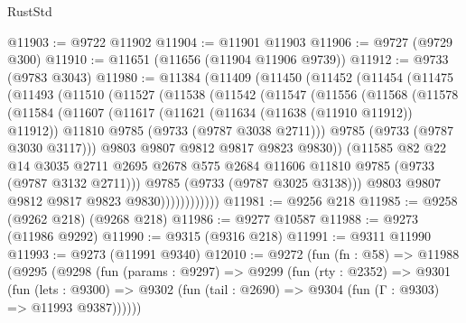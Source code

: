\begin{lexlean}{RustStd}
\begin{coremodule}
@11903 := @9722 @11902
@11904 := @11901 @11903
@11906 := @9727 (@9729 @300)
@11910 := @11651 (@11656 (@11904 @11906 @9739))
@11912 := @9733 (@9783 @3043)
@11980 := @11384
    (@11409
      (@11450
        (@11452
          (@11454
            (@11475
              (@11493
                (@11510
                  (@11527
                    (@11538
                      (@11542
                        (@11547
                          (@11556
                            (@11568
                              (@11578
                                (@11584
                                  (@11607
                                    (@11617
                                      (@11621 (@11634 (@11638 (@11910 @11912)) @11912))
                                      @11810
                                      @9785
                                      (@9733 (@9787 @3038 @2711)))
                                    @9785
                                    (@9733 (@9787 @3030 @3117)))
                                  @9803
                                  @9807
                                  @9812
                                  @9817
                                  @9823
                                  @9830))
                              (@11585
                                @82
                                @22
                                @14
                                @3035
                                @2711
                                @2695
                                @2678
                                @575
                                @2684
                                @11606
                                @11810
                                @9785
                                (@9733 (@9787 @3132 @2711)))
                              @9785
                              (@9733 (@9787 @3025 @3138)))
                            @9803
                            @9807
                            @9812
                            @9817
                            @9823
                            @9830))))))))))))
@11981 := @9256 @218
@11985 := @9258 (@9262 @218) (@9268 @218)
@11986 := @9277 @10587
@11988 := @9273 (@11986 @9292)
@11990 := @9315 (@9316 @218)
@11991 := @9311 @11990
@11993 := @9273 (@11991 @9340)
@12010 := @9272
    (fun (fn : @58) =>
    @11988
      (@9295
        (@9298
          (fun (params : @9297) =>
          @9299
            (fun (rty : @2352) =>
            @9301
              (fun (lets : @9300) =>
              @9302 (fun (tail : @2690) => @9304 (fun (Γ : @9303) => @11993 @9387))))))

\end{coremodule}
\end{lexlean}
